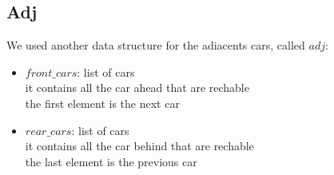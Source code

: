 \subsection{Adj}
We used another data structure for the adiacents cars, called $adj$:
\begin{itemize}
    \item $front\_cars$: list of cars\\ it contains all the car ahead that are rechable\\ the first element
     is the next car
    \item $rear\_cars$: list of cars\\ it contains all the car behind that are rechable\\ the last element
     is the previous car
\end{itemize} 